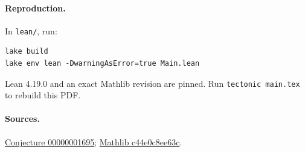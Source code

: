 \documentclass[11pt]{article}
\begin{document}
\paragraph{Reproduction.}
In \texttt{lean/}, run:
\begin{verbatim}
lake build
lake env lean -DwarningAsError=true Main.lean
\end{verbatim}
Lean 4.19.0 and an exact Mathlib revision are pinned. Run
\texttt{tectonic main.tex} to rebuild this PDF.

\paragraph{Sources.}
\href{https://github.com/The-Last-Math-Competition/The-Last-Math-Competition/blob/9b795e7a94a6076e49a65a6489e1caf9153abd23/conjectures/00000001695.md}{Conjecture 00000001695};
\href{https://github.com/leanprover-community/mathlib4/commit/c44e0c8ee63ca166450922a373c7409c5d26b00b}{Mathlib c44e0c8ee63c}.
\end{document}
